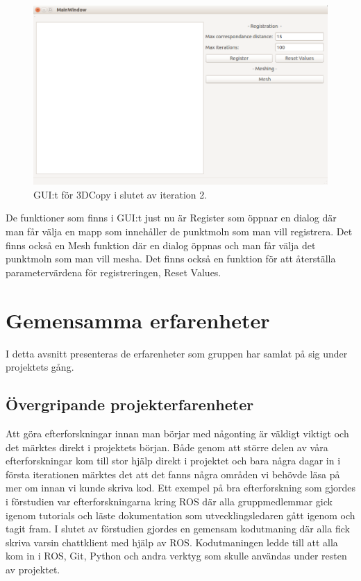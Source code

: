 \begin{figure}[H]
	\centering
	\includegraphics[width=130mm]{figures/3DCopyGUI.PNG}
	\caption{GUI:t för 3DCopy i slutet av iteration 2.}
	\label{fig:3dcopy_gui}
\end{figure}

De funktioner som finns i GUI:t just nu är Register som öppnar en dialog där man får välja en mapp som innehåller de punktmoln som man vill registrera. Det finns också en Mesh funktion där en dialog öppnas och man får välja det punktmoln som man vill mesha. Det finns också en funktion för att återställa parametervärdena för registreringen, Reset Values.

\section{Gemensamma erfarenheter}

I detta avsnitt presenteras de erfarenheter som gruppen har samlat på sig under projektets gång.

\subsection{Övergripande projekterfarenheter}

Att göra efterforskningar innan man börjar med någonting är väldigt viktigt och det märktes direkt i projektets början. Både genom att större delen av våra efterforskningar kom till stor hjälp direkt i projektet och bara några dagar in i första iterationen märktes det att det fanns några områden vi behövde läsa på mer om innan vi kunde skriva kod. Ett exempel på bra efterforskning som gjordes i förstudien var efterforskningarna kring ROS där alla gruppmedlemmar gick igenom tutorials och läste dokumentation som utvecklingsledaren gått igenom och tagit fram. I slutet av förstudien gjordes en gemensam kodutmaning där alla fick skriva varsin chattklient med hjälp av ROS. Kodutmaningen ledde till att alla kom in i ROS, Git, Python och andra verktyg som skulle användas under resten av projektet.


